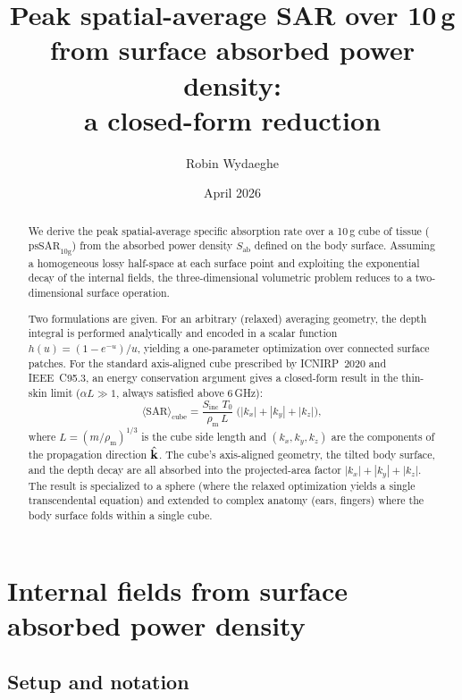 \documentclass[11pt,a4paper]{article}
\title{%
  Peak spatial-average SAR over 10\,g\\
  from surface absorbed power density:\\
  a closed-form reduction%
}
\author{Robin Wydaeghe}
\date{April 2026}
\theoremstyle{definition}
\theoremstyle{remark}
\newcommand{\Sab}{S_{\mathrm{ab}}}
\newcommand{\Sinc}{S_{\mathrm{inc}}}
\newcommand{\Tzero}{T_0}
\newcommand{\khat}{\hat{\vb{k}}}
\newcommand{\SAR}{\ensuremath{\mathrm{SAR}}}
\newcommand{\psSAR}{\ensuremath{\mathrm{psSAR}_{10\mathrm{g}}}}
\newcommand{\rhom}{\rho_{\mathrm{m}}}
\begin{document}
\maketitle

\begin{abstract}
We derive the peak spatial-average specific absorption rate over a 10\,g cube
of tissue (\psSAR) from the absorbed power density $\Sab$ defined on the body
surface.  Assuming a homogeneous lossy half-space at each surface point and
exploiting the exponential decay of the internal fields, the three-dimensional
volumetric problem reduces to a two-dimensional surface operation.

Two formulations are given.  For an arbitrary (relaxed) averaging geometry, the
depth integral is performed analytically and encoded in a scalar function
$h(u) = (1-e^{-u})/u$, yielding a one-parameter optimization over connected
surface patches.  For the standard axis-aligned cube prescribed by ICNIRP~2020
and IEEE~C95.3, an energy conservation argument gives a closed-form result in
the thin-skin limit ($\alpha L \gg 1$, always satisfied above 6\,GHz):
\[
  \langle\SAR\rangle_{\mathrm{cube}}
  = \frac{\Sinc\;\Tzero}{\rhom\,L}\;
    \bigl(|k_x| + |k_y| + |k_z|\bigr),
\]
where $L = (m/\rhom)^{1/3}$ is the cube side length and
$(k_x, k_y, k_z)$ are the components of the propagation direction $\khat$.
The cube's axis-aligned geometry, the tilted body surface, and the depth
decay are all absorbed into the projected-area factor
$|k_x| + |k_y| + |k_z|$.  The result is specialized to a sphere (where
the relaxed optimization yields a single transcendental equation) and
extended to complex anatomy (ears, fingers) where the body surface folds
within a single cube.
\end{abstract}

\tableofcontents


\section{Internal fields from surface absorbed power density}
\label{sec:internal-fields}

\subsection{Setup and notation}
\end{document}

